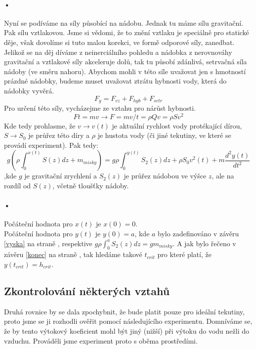 \documentclass[14pt,a4paper]{article}
\begin{document}
\paragraph*{•}
Nyní se podíváme na síly působící na nádobu. 
Jednak tu máme sílu gravitační. Pak sílu vztlakovou. Jsme si vědomi, že to znění vztlaku je speciálně pro statické děje, však dovolíme si tuto malou korekci, ve formě odporové síly, zanedbat.
Jelikož se na děj díváme z neinerciálního pohledu a nádobka z nerovnováhy gravitační a vztlakové síly akceleruje dolů, tak tu působí zdánlivá, setrvačná síla nádoby (ve směru nahoru). Abychom mohli v této síle uvažovat jen s hmotností prázdné nádobky, budeme muset uvažovat ztrátu hybnosti vody, která do nádobky vyvěrá.
$$F_g=F_{vz}+F_{hyb}+F_{setr}$$ 
Pro určení této síly, vycházejme ze vztahu pro nárůst hybnosti. 
$$Ft=mv \rightarrow F=mv/t=\rho Qv=\rho S v^2$$
Kde tedy prohlasme, že $v \rightarrow v(t)$ je aktuální rychlost vody protékající dírou, $S \rightarrow S_0$ je průřez této díry a $\rho$ je hustota vody (či jiné tekutiny, ve které se provádí experiment). Pak tedy:
\begin{equation}
g\left(\rho\int_{0}^{x(t)} S(z)dz+m_{misky}\right)=g \rho \int_{0}^{y(t)} S_2(z)dz+\rho S_0v^2(t)+m \frac{d^2y(t)}{dt^2}
\end{equation}
 ,kde $g$ je gravitační zrychlení a $S_2(z)$ je průřez nádobou ve výšce $z$, ale na rozdíl od $S(z)$, včetně tloušťky nádoby.
\paragraph*{•}
Počáteční hodnota pro $x(t)$ je $x(0)=0$.\\
Počáteční hodnota pro $y(t)$ je $y(0)=a$, kde $a$ bylo zadefinováno v závěru \ref{vyska} na straně \pageref{vyska}, respektive $g \rho \int_{0}^{a} S_2(z)dz=gm_{misky}$. A jak bylo řečeno v závěru \ref{konec} na straně \pageref{konec}, tak hledáme takové $t_{crit}$ pro které platí, že $y(t_{crit})=h_{crit}$.
\subsection{Zkontrolování některých vztahů}
Druhá rovnice by se dala zpochybnit, že bude platit pouze pro ideální tekutiny, proto jsme se ji rozhodli ověřit pomocí následujícího experimentu. Domníváme se, že by tento výtokový koeficient mohl být jiný (nižší) při výtoku do vodu nežli do vzduchu. Prováděli jsme experiment proto s oběma prostředími.
\end{document}
